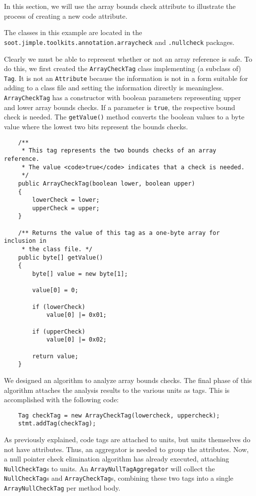 \documentclass{article}
\begin{document}
In this section, we will use the array bounds check attribute to 
illustrate the process of creating a new code attribute.

The classes in this example are located in the {\tt
soot.jimple.toolkits.annotation.arraycheck} and {\tt .nullcheck} packages.

Clearly we must be able to represent whether or not an array reference
is safe.  To do this, we first created the {\tt ArrayCheckTag} class
implementing (a subclass of) {\tt Tag}.  It is not an {\tt Attribute}
because the information is not in a form suitable for adding to a 
class file and setting the information directly is meaningless.  
{\tt ArrayCheckTag} has a constructor
with boolean parameters representing upper and lower array bounds checks. If
a parameter is {\tt true}, the respective bound check is needed. The
{\tt getValue()} method converts the boolean values to a byte value
where the lowest two bits represent the bounds checks.

\begin{verbatim}
    /** 
     * This tag represents the two bounds checks of an array reference.
     * The value <code>true</code> indicates that a check is needed.
     */
    public ArrayCheckTag(boolean lower, boolean upper)
    {
        lowerCheck = lower;
        upperCheck = upper;
    }

    /** Returns the value of this tag as a one-byte array for inclusion in
     * the class file. */
    public byte[] getValue()
    {
        byte[] value = new byte[1];

        value[0] = 0;
        
        if (lowerCheck)
            value[0] |= 0x01;
        
        if (upperCheck)
            value[0] |= 0x02;

        return value;
    }
\end{verbatim}

We designed an algorithm to analyze array bounds checks. The final
phase of this algorithm attaches the analysis results to the various
units as tags. This is accomplished with the following code:
\begin{verbatim}
    Tag checkTag = new ArrayCheckTag(lowercheck, uppercheck);
    stmt.addTag(checkTag);
\end{verbatim}

As previously explained, code tags are attached to units, but units
themselves do not have attributes. Thus, an aggregator
is needed to group the attributes. Now, a null pointer check
elimination algorithm has already executed, attaching {\tt NullCheckTag}s to
units. An {\tt ArrayNullTagAggregator} will collect the {\tt NullCheckTag}s
and {\tt ArrayCheckTag}s, combining these two tags into 
a single {\tt ArrayNullCheckTag} per method body.
\end{document}
